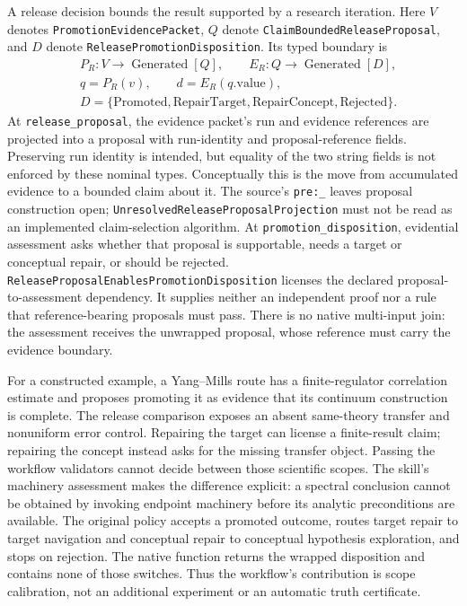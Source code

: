 A release decision bounds the result supported by a research iteration.
Here $V$ denotes \texttt{Promotion\allowbreak Evidence\allowbreak Packet}, $Q$ denote
\texttt{Claim\allowbreak Bounded\allowbreak Release\allowbreak Proposal}, and $D$ denote
\texttt{Release\allowbreak Promotion\allowbreak Disposition}. Its typed boundary is
\[
\begin{aligned}
&P_R:V\to\operatorname{Generated}[Q],\qquad
 E_R:Q\to\operatorname{Generated}[D],\\
&q=P_R(v),\qquad d=E_R(q.\mathrm{value}),\\
&D=\{\mathrm{Promoted},\mathrm{RepairTarget},
       \mathrm{RepairConcept},\mathrm{Rejected}\}.
\end{aligned}
\]
At \texttt{release\_\allowbreak proposal}, the evidence packet's run and evidence references
are projected into a proposal with run-identity and proposal-reference fields.
Preserving run identity is intended, but equality of the two string fields is
not enforced by these nominal types. Conceptually this is the move from accumulated evidence to a bounded
claim about it. The source's \texttt{pre:\_\allowbreak } leaves proposal construction open;
\texttt{Unresolved\allowbreak Release\allowbreak Proposal\allowbreak Projection} must not be read as an implemented
claim-selection algorithm. At \texttt{promotion\_\allowbreak disposition}, evidential
assessment asks whether that proposal is supportable, needs a target or conceptual
repair, or should be rejected. \texttt{Release\allowbreak Proposal\allowbreak Enables\allowbreak Promotion\allowbreak Disposition}
licenses the declared proposal-to-assessment dependency. It supplies neither an
independent proof nor a rule that reference-bearing proposals must pass. There is
no native multi-input join: the assessment receives the unwrapped proposal, whose
reference must carry the evidence boundary.

For a constructed example, a Yang--Mills route has a finite-regulator correlation
estimate and proposes promoting it as evidence that its continuum construction is
complete. The release comparison exposes an absent same-theory transfer and
nonuniform error control. Repairing the target can license a finite-result claim;
repairing the concept instead asks for the missing transfer object. Passing the
workflow validators cannot decide between those scientific scopes. The skill's
machinery assessment makes the difference explicit: a spectral conclusion cannot
be obtained by invoking endpoint machinery before its analytic preconditions are
available.
The original policy accepts a promoted outcome, routes target repair to target
navigation and conceptual repair to conceptual hypothesis exploration, and stops
on rejection. The native function returns the wrapped disposition and contains
none of those switches. Thus the workflow's contribution is scope calibration,
not an additional experiment or an automatic truth certificate.

